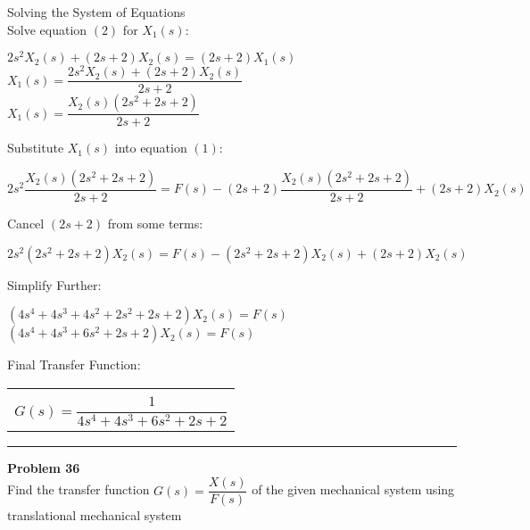 \documentclass[11pt,letterpaper]{article}
\begin{document}
Solving the System of Equations\\[12pt]
Solve equation $(2)$ for $X_1(s)$:\\
\begin{center}
	$2s^2X_2(s)+(2s+2)X_2(s)=(2s+2)X_1(s)$\\[12pt]
	$X_1(s)=\dfrac{2s^2X_2(s)+(2s+2)X_2(s)}{2s+2}$\\[12pt]
	$X_1(s)=\dfrac{X_2(s)(2s^2+2s+2)}{2s+2}$\\[12pt]
\end{center}
Substitute $X_1(s)$ into equation $(1)$:\\
\begin{center}
	$2s^2\dfrac{X_2(s)(2s^2+2s+2)}{2s+2}=F(s)-(2s+2)\dfrac{X_2(s)(2s^2+2s+2)}{2s+2}+(2s+2)X_2(s)$\\[12pt]
\end{center}
Cancel $(2s+2)$ from some terms:\\
\begin{center}
	$2s^2(2s^2+2s+2)X_2(s)=F(s)-(2s^2+2s+2)X_2(s)+(2s+2)X_2(s)$\\
\end{center}
Simplify Further:\\
\begin{center}
	$(4s^4+4s^3+4s^2+2s^2+2s+2)X_2(s)=F(s)$\\[12pt]
	$(4s^4+4s^3+6s^2+2s+2)X_2(s)=F(s)$\\[12pt]
\end{center}
Final Transfer Function:\\
\begin{center}
	\begin{tabular}{|c|}
		\hline \\
		$G(s)=\dfrac{1}{4s^4+4s^3+6s^2+2s+2}$\\[12pt]
	\hline
	\end{tabular}	
\end{center}


\clearpage


\rule{\textwidth}{1pt}
\textbf{Problem 36}\\
Find the transfer function $G(s)=\dfrac{X(s)}{F(s)}$ of the given mechanical system using translational mechanical system\\
\end{document}
